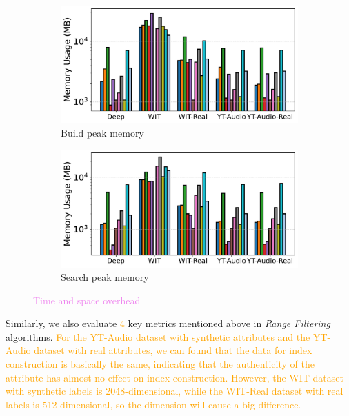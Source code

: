 \documentclass[sigconf, nonacm]{acmart}
\begin{document}
\begin{figure}[t]
		\begin{subfigure}[t]{0.49\columnwidth}
			\centering
			\includegraphics[width=\linewidth]{figures/indexData/rangeFilter_memory_mb_comparison_query.pdf}
			\caption{\footnotesize Build peak memory}
			\label{fig:rangeFilter_build_memory_mb}
		\end{subfigure}
		\hfill
		\begin{subfigure}[t]{0.49\columnwidth}
			\centering
			\includegraphics[width=\linewidth]{figures/searchMem/range_memory_comparison.pdf}
			\caption{\footnotesize Search peak memory}
			\label{fig:rangeFilter_search_memory_mb}
		\end{subfigure}
		
		\caption{\textcolor{violet}{Time and space overhead}}
		\label{fig:rangeFilter_build_index_comparison}
	\end{figure}
	
	Similarly, we also evaluate \textcolor{orange}{4} key metrics mentioned above in \textit{Range Filtering} algorithms. \textcolor{orange}{For the YT-Audio dataset with synthetic attributes and the YT-Audio dataset with real attributes, we can found that the data for index construction is basically the same, indicating that the authenticity of the attribute has almost no effect on index construction.
	However, the WIT dataset with synthetic labels is 2048-dimensional, while the WIT-Real dataset with real labels is 512-dimensional, so the dimension will cause a big difference.}
	
\end{document}

